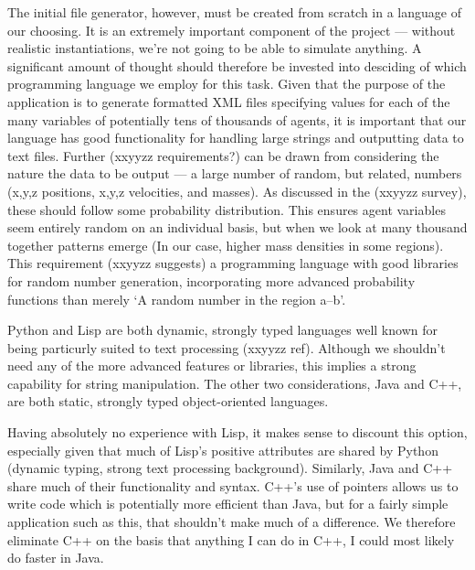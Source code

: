 \documentclass[11pt,a4paper]{article}
\begin{document}
The initial file generator, however, must be created from scratch in a language of our choosing. It is an extremely important component of the project --- without realistic instantiations, we're not going to be able to simulate anything. A significant amount of thought should therefore be invested into desciding of which programming language we employ for this task. Given that the purpose of the application is to generate formatted XML files specifying values for each of the many variables of potentially tens of thousands of agents, it is important that our language has good functionality for handling large strings and outputting data to text files. Further (xxyyzz requirements?) can be drawn from considering the nature the data to be output --- a large number of random, but related, numbers (x,y,z positions, x,y,z velocities, and masses). As discussed in the (xxyyzz survey), these should follow some probability distribution. This ensures agent variables seem entirely random on an individual basis, but when we look at many thousand together patterns emerge (In our case, higher mass densities in some regions). This requirement (xxyyzz suggests) a programming language with good libraries for random number generation, incorporating more advanced probability functions than merely `A random number in the region a--b'.

Python and Lisp are both dynamic, strongly typed languages well known for being particurly suited to text processing (xxyyzz ref). Although we shouldn't need any of the more advanced features or libraries, this implies a strong capability for string manipulation. The other two considerations, Java and C++, are both static, strongly typed object-oriented languages. 

Having absolutely no experience with Lisp, it makes sense to discount this option, especially given that much of Lisp's positive attributes are shared by Python (dynamic typing, strong text processing background). Similarly, Java and C++ share much of their functionality and syntax. C++'s use of pointers allows us to write code which is potentially more efficient than Java, but for a fairly simple application such as this, that shouldn't make much of a difference. We therefore eliminate C++ on the basis that anything I can do in C++, I could most likely do faster in Java. 
\end{document}

